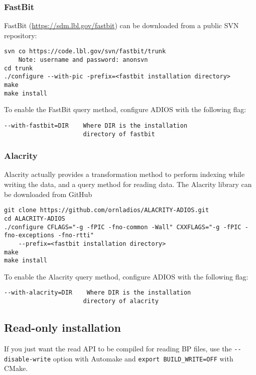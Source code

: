 \subsubsection{FastBit}
FastBit (\url{https://sdm.lbl.gov/fastbit}) can be downloaded from a public SVN repository:

\begin{lstlisting}[language={}]
svn co https://code.lbl.gov/svn/fastbit/trunk
    Note: username and password: anonsvn
cd trunk
./configure --with-pic -prefix=<fastbit installation directory>
make
make install
\end{lstlisting}

\noindent To enable the FastBit query method, configure ADIOS with the following flag:
\begin{lstlisting}
--with-fastbit=DIR    Where DIR is the installation
                      directory of fastbit
\end{lstlisting}

\subsubsection{Alacrity}
Alacrity actually provides a transformation method to perform indexing while writing the data, and a query method for reading data. The Alacrity library can be downloaded from GitHub

\begin{lstlisting}[language={}]
git clone https://github.com/ornladios/ALACRITY-ADIOS.git
cd ALACRITY-ADIOS
./configure CFLAGS="-g -fPIC -fno-common -Wall" CXXFLAGS="-g -fPIC -fno-exceptions -fno-rtti" 
    --prefix=<fastbit installation directory>
make
make install
\end{lstlisting}

\noindent To enable the Alacrity query method, configure ADIOS with the following flag:
\begin{lstlisting}
--with-alacrity=DIR    Where DIR is the installation
                      directory of alacrity
\end{lstlisting}




\subsection{Read-only installation}

If you just want the read API to be compiled for reading BP files, use the \verb+--disable-write+ option with Automake and \verb+export BUILD_WRITE=OFF+ with CMake.


